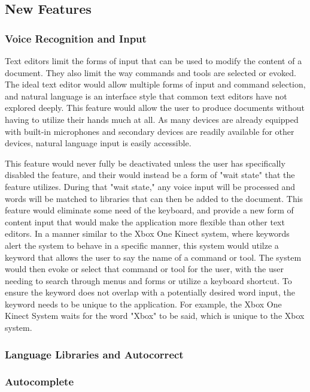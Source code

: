 \documentclass[11pt, oneside]{article}
\begin{document}
\subsection{New Features}
\subsubsection{Voice Recognition and Input}
Text editors limit the forms of input that can be used to modify the content of a document. They also limit the way commands and tools are selected or evoked. The ideal text editor would allow multiple forms of input and command selection, and natural language is an interface style that common text editors have not explored deeply. This feature would allow the user to produce documents without having to utilize their hands much at all. As many devices are already equipped with built-in microphones and secondary devices are readily available for other devices, natural language input is easily accessible. 

This feature would never fully be deactivated unless the user has specifically disabled the feature, and their would instead be a form of "wait state" that the feature utilizes. During that "wait state," any voice input will be processed and words will be matched to libraries that can then be added to the document. This feature would eliminate some need of the keyboard, and provide a new form of content input that would make the application more flexible than other text editors. In a manner similar to the Xbox One Kinect system, where keywords alert the system to behave in a specific manner, this system would utilze a keyword that allows the user to say the name of a command or tool. The system would then evoke or select that command or tool for the user, with the user needing to search through menus and forms or utilize a keyboard shortcut. To ensure the keyword does not overlap with a potentially desired word input, the keyword needs to be unique to the application. For example, the Xbox One Kinect System waits for the word "Xbox" to be said, which is unique to the Xbox system. 

\subsubsection{Language Libraries and Autocorrect}
\subsubsection{Autocomplete}
\end{document}

